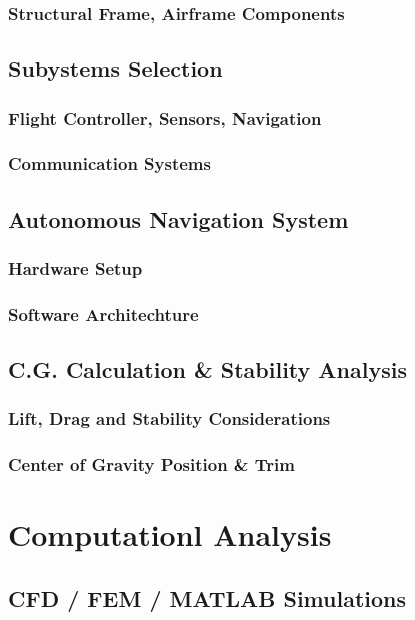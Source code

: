 \documentclass[12pt]{report}
\begin{document}
      \subsection{Structural Frame, Airframe Components}
    

    \section{Subystems Selection}
      \subsection{Flight Controller, Sensors, Navigation}
      \subsection{Communication Systems}

    \section{Autonomous Navigation System}
      \subsection{Hardware Setup}
      \subsection{Software Architechture}

    \section{C.G. Calculation \& Stability Analysis}
      \subsection{Lift, Drag and Stability Considerations}
      \subsection{Center of Gravity Position \& Trim}

  \chapter{Computationl Analysis}
    \section{CFD / FEM / MATLAB Simulations}
\end{document}
